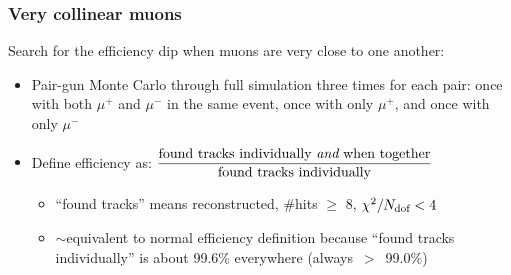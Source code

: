 \documentclass[compress]{beamer}
\newcommand{\s}[1]{{\mbox{\scriptsize #1}}}
\begin{document}
\begin{frame}
\frametitle{Very collinear muons}

Search for the efficiency dip when muons are very close to one another:
\begin{itemize}
\item Pair-gun Monte Carlo through full simulation three times for each pair: once with both $\mu^+$ and $\mu^-$ in the same event, once with only $\mu^+$, and once with only $\mu^-$

\item Define efficiency as: $\displaystyle \frac{\mbox{found tracks individually {\it and} when together}}{\mbox{found tracks individually}}$
\begin{itemize}
\item ``found tracks'' means reconstructed, \#hits $\ge$ 8, $\chi^2/N_\s{dof} < 4$
\item $\sim$equivalent to normal efficiency definition because ``found tracks individually'' is about 99.6\% everywhere \mbox{\scriptsize (always $>$ 99.0\%)}
\end{itemize}
\end{itemize}


\end{frame}
\end{document}
